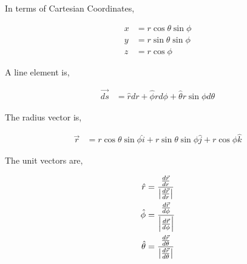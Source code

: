 \documentclass[11pt]{article}
\begin{document}
In terms of Cartesian Coordinates,

\begin{align}
  \label{eq:sp2carOAt}
  x &= r\cos{\theta}\sin{\phi} \\
  y &= r\sin{\theta}\sin{\phi} \\
  z &= r\cos{\phi}
\end{align}

A line element is,

\begin{align}
  \vec{ds} &= \hat{r}dr + \hat{\phi} rd\phi + \hat{\theta} r\sin{\phi}d\theta
\end{align}

The radius vector is,

\begin{align}
  \vec{r} &= r\cos{\theta}\sin{\phi}\hat{i} + r\sin{\theta}\sin{\phi}\hat{j} + r\cos{\phi}\hat{k}
\end{align}

The unit vectors are,

\begin{align}
  \hat{r} &= \frac{\frac{d\vec{r}}{dr}}{\abs{\frac{d\vec{r}}{dr}}} \\
  \hat{\phi} &= \frac{\frac{d\vec{r}}{d\phi}}{\abs{\frac{d\vec{r}}{d\phi}}} \\
  \hat{\theta} &= \frac{\frac{d\vec{r}}{d\theta}}{\abs{\frac{d\vec{r}}{d\theta}}}
\end{align}



\end{document}
